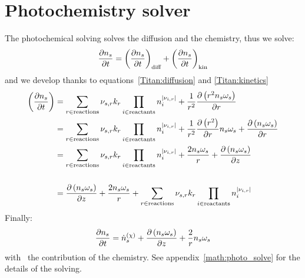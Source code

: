 \section{Photochemistry solver}

The photochemical solving solves the diffusion and the chemistry, thus we solve:
\begin{equation}
\frac{\partial n_s}{\partial t} = \left(\frac{\partial n_s}{\partial t}\right)_\text{diff} + \left(\frac{\partial n_s}{\partial t}\right)_\text{kin}
\end{equation}
and we develop thanks to equations~\ref{Titan:diffusion} and \ref{Titan:kinetics}
\begin{equation}
\begin{split}
\left(\frac{\partial n_s}{\partial t}\right) & = \sum_{r\in \text{reactions}} {\nu_{s,r}}k_{r} \prod_{i\in\text{reactants}}n_i^{|{\nu_{i,r}}|} +
                                     \frac{1}{r^2}\frac{\partial\left(r^2n_s\omega_s\right)}{\partial r} \\
                                 & = \sum_{r\in \text{reactions}} {\nu_{s,r}} k_r\prod_{i\in\text{reactants}}n_i^{|{\nu_{i,r}}|} +
                                     \frac{1}{r^2}\frac{\partial\left(r^2\right)}{\partial r}n_s\omega_s + \frac{\partial\left(n_s\omega_s\right)}{\partial r} \\
                                 & = \sum_{r\in \text{reactions}} {\nu_{s,r}} k_{r}\prod_{i\in\text{reactants}}n_i^{|{\nu_{i,r}}|} +
                                     \frac{2n_s\omega_s}{r} + \frac{\partial\left(n_s\omega_s\right)}{\partial z} \\[\baselineskip]
                                 & = \frac{\partial\left(n_s\omega_s\right)}{\partial z} + \frac{2n_s\omega_s}{r} + \sum_{r\in \text{reactions}} {\nu_{s,r}} k_{r}\prod_{i\in\text{reactants}}n_i^{|{\nu_{i,r}}|} 
\end{split}
\end{equation}
Finally:
\begin{equation}
\frac{\partial n_s}{\partial t} = \dot{n}^{(\chi)}_s + \frac{\partial\left(n_s\omega_s\right)}{\partial z} + \frac{2}{r}n_s\omega_s
\label{Titan:photochem_eq}
\end{equation}
with \omegadot\ the contribution of the chemistry.
See appendix~\ref{math:photo_solve} for the details of the solving.
